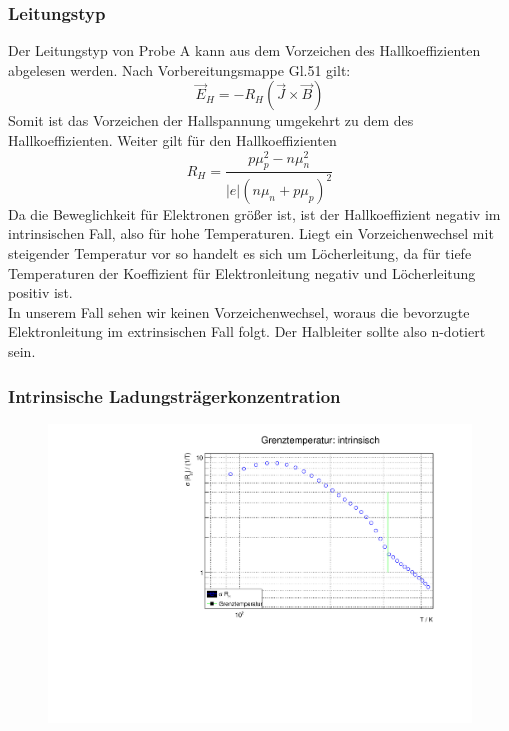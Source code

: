 \subsubsection{Leitungstyp}
\FloatBarrier

Der Leitungstyp von Probe A kann aus dem Vorzeichen des Hallkoeffizienten abgelesen werden. Nach Vorbereitungsmappe Gl.51 gilt:
$$\vec{E}_H = - R_H (\vec{J} \times \vec{B}) $$
Somit ist das Vorzeichen der Hallspannung umgekehrt zu dem des Hallkoeffizienten. Weiter gilt für den Hallkoeffizienten
$$R_H = \frac{p\mu_p^{2} - n \mu _n ^{2}}{\vert e \vert (n \mu _n + p \mu _p)^{2}} $$
Da die Beweglichkeit für Elektronen größer ist, ist der Hallkoeffizient negativ im intrinsischen Fall, also für hohe Temperaturen. Liegt ein Vorzeichenwechsel mit steigender Temperatur vor so handelt es sich um Löcherleitung, da für tiefe Temperaturen der Koeffizient für Elektronleitung negativ und Löcherleitung positiv ist. \\
In unserem Fall sehen wir keinen Vorzeichenwechsel, woraus die bevorzugte Elektronleitung im extrinsischen Fall folgt. Der Halbleiter sollte also n-dotiert sein.

\subsubsection{Intrinsische Ladungsträgerkonzentration}
\FloatBarrier

\begin{figure}
\label{fig:leitin}
\centering
\includegraphics[scale = 0.5]{../data/A2in.pdf}
\caption{}
\end{figure}



